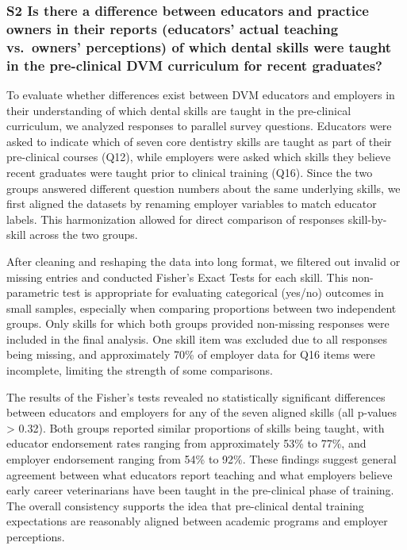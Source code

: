 \documentclass[
  11pt,
  letterpaper,
  DIV=11,
  numbers=noendperiod]{scrartcl}
\numberwithin{figure}{section}
\begin{document}
\subsubsection{S2 Is there a difference between educators and practice
owners in their reports (educators' actual teaching vs.~owners'
perceptions) of which dental skills were taught in the pre-clinical DVM
curriculum for recent
graduates?}\label{s2-is-there-a-difference-between-educators-and-practice-owners-in-their-reports-educators-actual-teaching-vs.-owners-perceptions-of-which-dental-skills-were-taught-in-the-pre-clinical-dvm-curriculum-for-recent-graduates}

To evaluate whether differences exist between DVM educators and
employers in their understanding of which dental skills are taught in
the pre-clinical curriculum, we analyzed responses to parallel survey
questions. Educators were asked to indicate which of seven core
dentistry skills are taught as part of their pre-clinical courses (Q12),
while employers were asked which skills they believe recent graduates
were taught prior to clinical training (Q16). Since the two groups
answered different question numbers about the same underlying skills, we
first aligned the datasets by renaming employer variables to match
educator labels. This harmonization allowed for direct comparison of
responses skill-by-skill across the two groups.

After cleaning and reshaping the data into long format, we filtered out
invalid or missing entries and conducted Fisher's Exact Tests for each
skill. This non-parametric test is appropriate for evaluating
categorical (yes/no) outcomes in small samples, especially when
comparing proportions between two independent groups. Only skills for
which both groups provided non-missing responses were included in the
final analysis. One skill item was excluded due to all responses being
missing, and approximately 70\% of employer data for Q16 items were
incomplete, limiting the strength of some comparisons.

The results of the Fisher's tests revealed no statistically significant
differences between educators and employers for any of the seven aligned
skills (all p-values \textgreater{} 0.32). Both groups reported similar
proportions of skills being taught, with educator endorsement rates
ranging from approximately 53\% to 77\%, and employer endorsement
ranging from 54\% to 92\%. These findings suggest general agreement
between what educators report teaching and what employers believe early
career veterinarians have been taught in the pre-clinical phase of
training. The overall consistency supports the idea that pre-clinical
dental training expectations are reasonably aligned between academic
programs and employer perceptions.
\end{document}
